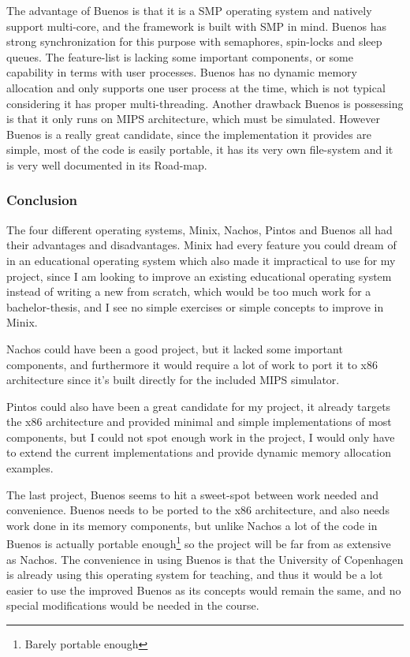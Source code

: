 The advantage of Buenos is that it is a SMP operating system and natively support multi-core, and the framework is built with SMP in mind. Buenos has strong synchronization for this purpose with semaphores, spin-locks and sleep queues. The feature-list is lacking some important components, or some capability in terms with user processes. Buenos has no dynamic memory allocation and only supports one user process at the time, which is not typical considering it has proper multi-threading. Another drawback Buenos is possessing is that it only runs on MIPS architecture, which must be simulated. However Buenos is a really great candidate, since the implementation it provides are simple, most of the code is easily portable, it has its very own file-system and it is very well documented in its Road-map. 

\subsubsection{Conclusion}

The four different operating systems, Minix, Nachos, Pintos and Buenos all had their advantages and disadvantages. Minix had every feature you could dream of in an educational operating system which also made it impractical to use for my project, since I am looking to improve an existing educational operating system instead of writing a new from scratch, which would be too much work for a bachelor-thesis, and I see no simple exercises or simple concepts to improve in Minix.

Nachos could have been a good project, but it lacked some important components, and furthermore it would require a lot of work to port it to x86 architecture since it's built directly for the included MIPS simulator.

Pintos could also have been a great candidate for my project, it already targets the x86 architecture and provided minimal and simple implementations of most components, but I could not spot enough work in the project, I would only have to extend the current implementations and provide dynamic memory allocation examples.

The last project, Buenos seems to hit a sweet-spot between work needed and convenience. Buenos needs to be ported to the x86 architecture, and also needs work done in its memory components, but unlike Nachos a lot of the code in Buenos is actually portable enough\footnote{Barely portable enough} so the project will be far from as extensive as Nachos. The convenience in using Buenos is that the University of Copenhagen is already using this operating system for teaching, and thus it would be a lot easier to use the improved Buenos as its concepts would remain the same, and no special modifications would be needed in the course.

